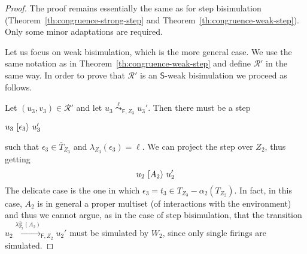 \documentclass{LMCS}
\newcommand{\monSub}[2]{\ensuremath{{#1}_{#2}^\oplus}}
\newcommand{\trans}[1]{\ensuremath{\ [\/{#1}\/\rangle}\ }
\newcommand{\ltr}[3][x]{\ensuremath{\stackrel{{#3}}{\longrightarrow}_{\mathsf{#1},#2}}}
\newcommand{\wltr}[3][x]{\ensuremath{\stackrel{{#3}}{\leadsto}_{\mathsf{#1},#2}}}
\begin{document}
\begin{proof}
  The proof remains essentially the same as for step bisimulation
  (Theorem~\ref{th:congruence-strong-step} and
  Theorem~\ref{th:congruence-weak-step}). Only some minor adaptations
  are required.

  Let us focus on weak bisimulation, which is the more general case.
  We use the same notation as in Theorem~\ref{th:congruence-weak-step}
  and define $\mathcal{R}'$ in the same way. In order to prove that
  $\mathcal{R}'$ is an $\mathsf{S}$-weak bisimulation we proceed as
  follows.


Let $(u_3, v_3) \in \mathcal{R}'$ and let $u_3 \wltr[F]{Z_3}{\ell} u_3'$. Then there must be a step
\begin{center}
  $u_3 \trans{\epsilon_3} u_3'$
\end{center}
such that $\epsilon_3 \in \bar{T}_{Z_3}$ and
$\lambda_{Z_3}(\epsilon_3) = \ell$.
We can project the step over $Z_2$, thus getting
\begin{equation}
  \label{eq:obis}
  u_2 \trans{A_2} u_2'
\end{equation}
The delicate case is the one in which $\epsilon_3 = t_3 \in T_{Z_3} -
\alpha_2(T_{Z_2})$. In fact, in this case, $A_2$ is in general a proper
multiset (of interactions with the environment) and thus we cannot
argue, as in the case of step bisimulation, that the transition $u_2
\ltr[F]{Z_2}{\monSub{\lambda}{{Z_2}}(A_2)} u_2'$ must be simulated by $W_2$, since
only single firings are simulated.


\end{proof}
\end{document}
